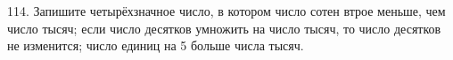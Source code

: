 114. Запишите четырёхзначное число, в котором число сотен втрое меньше, чем число тысяч; если число десятков умножить на число тысяч, то число десятков не изменится; число единиц на 5 больше числа тысяч.\\
